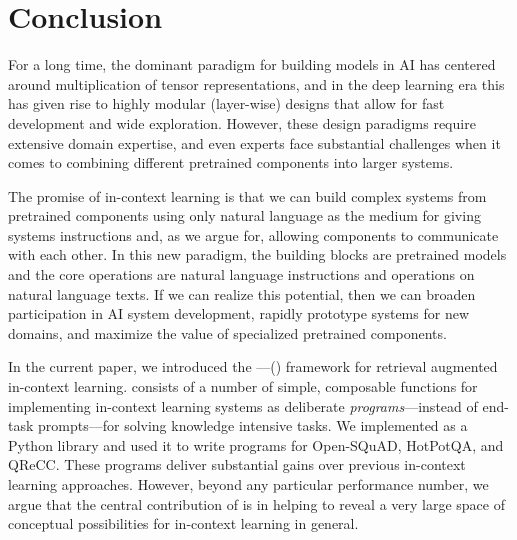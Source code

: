 \section{Conclusion}


For a long time, the dominant paradigm for building models in AI has centered around multiplication of tensor representations, and in the deep learning era this has given rise to highly modular (layer-wise) designs that allow for fast development and wide exploration. However, these design paradigms require extensive domain expertise, and even experts face substantial challenges when it comes to combining different pretrained components into larger systems.

The promise of in-context learning is that we can build complex systems from pretrained components using only natural language as the medium for giving systems instructions and, as we argue for, allowing components to communicate with each other. In this new paradigm, the building blocks are pretrained models and the core operations are natural language instructions and operations on natural language texts. If we can realize this potential, then we can broaden participation in AI system development, rapidly prototype systems for new domains, and maximize the value of specialized pretrained components.

In the current paper, we introduced the \demonstrate--\search--\predict (\DSP) framework for retrieval augmented in-context learning. \DSP{} consists of a number of simple, composable functions for implementing in-context learning systems as deliberate \textit{programs}---instead of end-task prompts---for solving knowledge intensive tasks. We implemented \DSP{} as a Python library and used it to write programs for Open-SQuAD, HotPotQA, and QReCC. These programs deliver substantial gains over previous in-context learning approaches. However, beyond any particular performance number, we argue that the central contribution of \DSP{} is in helping to reveal a very large space of conceptual possibilities for in-context learning in general.